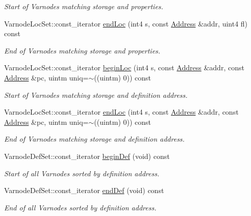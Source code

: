 \begin{DoxyCompactItemize}
\begin{DoxyCompactList}\small\item\em Start of Varnodes matching storage and properties. \end{DoxyCompactList}\item 
Varnode\+Loc\+Set\+::const\+\_\+iterator \mbox{\hyperlink{class_funcdata_a9b418941dce53af9e8ac8dcbd453a44f}{end\+Loc}} (int4 s, const \mbox{\hyperlink{class_address}{Address}} \&addr, uint4 fl) const
\begin{DoxyCompactList}\small\item\em End of Varnodes matching storage and properties. \end{DoxyCompactList}\item 
Varnode\+Loc\+Set\+::const\+\_\+iterator \mbox{\hyperlink{class_funcdata_a1ad396df61c154668d1f768918b46254}{begin\+Loc}} (int4 s, const \mbox{\hyperlink{class_address}{Address}} \&addr, const \mbox{\hyperlink{class_address}{Address}} \&pc, uintm uniq=$\sim$((uintm) 0)) const
\begin{DoxyCompactList}\small\item\em Start of Varnodes matching storage and definition address. \end{DoxyCompactList}\item 
Varnode\+Loc\+Set\+::const\+\_\+iterator \mbox{\hyperlink{class_funcdata_addfc7faf2c1793283d70d16a2313416e}{end\+Loc}} (int4 s, const \mbox{\hyperlink{class_address}{Address}} \&addr, const \mbox{\hyperlink{class_address}{Address}} \&pc, uintm uniq=$\sim$((uintm) 0)) const
\begin{DoxyCompactList}\small\item\em End of Varnodes matching storage and definition address. \end{DoxyCompactList}\item 
Varnode\+Def\+Set\+::const\+\_\+iterator \mbox{\hyperlink{class_funcdata_af9350996f6f24052be034b59bfd383b2}{begin\+Def}} (void) const
\begin{DoxyCompactList}\small\item\em Start of all Varnodes sorted by definition address. \end{DoxyCompactList}\item 
Varnode\+Def\+Set\+::const\+\_\+iterator \mbox{\hyperlink{class_funcdata_ad5fba46eb4e585463bafe3461d415fd4}{end\+Def}} (void) const
\begin{DoxyCompactList}\small\item\em End of all Varnodes sorted by definition address. \end{DoxyCompactList}\item 

\end{DoxyCompactItemize}
